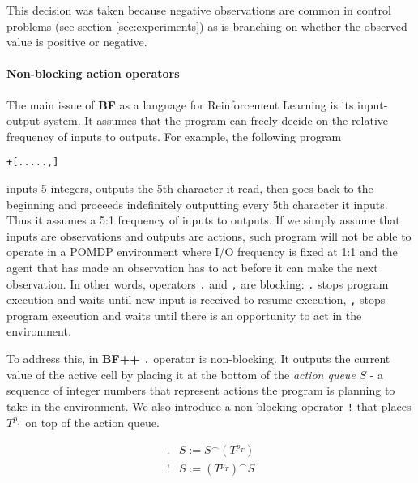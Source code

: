 This decision was taken because negative observations are common in control problems (see section \ref{sec:experiments}) as is branching on whether the observed value is positive or negative. 

\paragraph{Non-blocking action operators}
\label{sec:queue}


The main issue of \textbf{BF} as a language for Reinforcement Learning is its input-output system.
It assumes that the program can freely decide on the relative frequency of inputs to outputs.
For example, the following program

\begin{center}
\begin{lstlisting}
+[.....,]
\end{lstlisting}
\end{center}

inputs 5 integers, outputs the 5th character it read, then goes back to the beginning and proceeds indefinitely outputting every 5th character it inputs.
Thus it assumes a 5:1 frequency of inputs to outputs.
If we simply assume that inputs are observations and outputs are actions, such program will not be able to operate in a POMDP environment where I/O frequency is fixed at 1:1 and the agent that has made an observation has to act before it can make the next observation.
In other words, operators \texttt{.} and \texttt{,} are blocking: \texttt{.} stops program execution and waits until new input is received to resume execution, \texttt{,} stops program execution and waits until there is an opportunity to act in the environment.

To address this, in \textbf{BF++} \texttt{.} operator is non-blocking.
It outputs the current value of the active cell by placing it at the bottom of the \textit{action queue} $S$ - a sequence of integer numbers that represent actions the program is planning to take in the environment. We also introduce a non-blocking operator \texttt{!} that places $T^{p_T}$ on top of the action queue.

\begin{equation}
    \begin{array}{cc}
         . & S := S^\frown (T^{p_T}) \\
         ! & S := (T^{p_T})^\frown S
    \end{array}
\end{equation}

